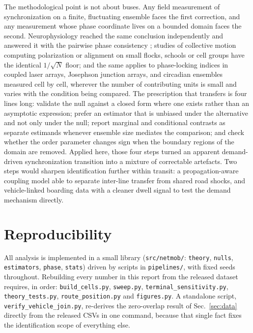 \documentclass[9pt,twocolumn,twoside]{opticajnl}
\begin{document}
The methodological point is not about buses. Any field measurement of synchronization on a
finite, fluctuating ensemble faces the first correction, and any measurement whose phase
coordinate lives on a bounded domain faces the second. Neurophysiology reached the same
conclusion independently and answered it with the pairwise phase consistency \cite{vinck10};
studies of collective motion computing polarization or alignment on small flocks, schools or
cell groups have the identical $1/\sqrt{N}$ floor; and the same applies to phase-locking indices
in coupled laser arrays, Josephson junction arrays, and circadian ensembles measured cell by
cell, wherever the number of contributing units is small and varies with the condition being
compared. The prescription that transfers is four lines long: validate the null against a closed
form where one exists rather than an asymptotic expression; prefer an estimator that is unbiased
under the alternative and not only under the null; report marginal and conditional contrasts as
separate estimands whenever ensemble size mediates the comparison; and check whether the order
parameter changes sign when the boundary regions of the domain are removed. Applied here, those
four steps turned an apparent demand-driven synchronization transition into a mixture of
correctable artefacts. Two steps would sharpen identification further within transit: a
propagation-aware coupling model able to separate inter-line transfer from shared road shocks,
and vehicle-linked boarding data with a cleaner dwell signal to test the demand mechanism
directly.

\appendix

\section{Reproducibility}\label{app:repro}

All analysis is implemented in a small library (\texttt{src/netmob/}: \texttt{theory},
\texttt{nulls}, \texttt{estimators}, \texttt{phase}, \texttt{stats}) driven by scripts in
\texttt{pipelines/}, with fixed seeds throughout. Rebuilding every number in this report from the
released dataset requires, in order: \texttt{build\_cells.py}, \texttt{sweep.py},
\texttt{terminal\_sensitivity.py}, \texttt{theory\_tests.py}, \texttt{route\_position.py} and
\texttt{figures.py}. A standalone script, \texttt{verify\_vehicle\_join.py}, re-derives the
zero-overlap result of Sec.~\ref{sec:data} directly from the released CSVs in one command,
because that single fact fixes the identification scope of everything else.
\end{document}
